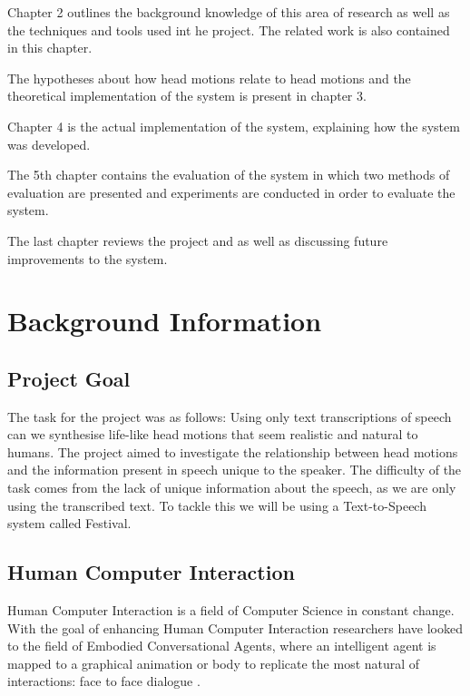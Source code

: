 \documentclass[bsc,frontabs,twoside,singlespacing,parskip,deptreport]{infthesis}
\begin{document}
Chapter 2 outlines the background knowledge of this area of research as well as the techniques and tools used int he project. The related work is also contained in this chapter.

The hypotheses about how head motions relate to head motions and the theoretical implementation of the system is present in chapter 3.

Chapter 4 is the actual implementation of the system, explaining how the system was developed.

The 5th chapter contains the evaluation of the system in which two methods of evaluation are presented and experiments are conducted in order to evaluate the system.

The last chapter reviews the project and as well as discussing future improvements to the system.



\chapter{Background Information}

\section{Project Goal}

The task for the project was as follows: Using only text transcriptions of speech can we synthesise life-like head motions that seem realistic and natural to humans. The project aimed to investigate the relationship between head motions and the information present in speech unique to the speaker. The difficulty of the task comes from the lack of unique information about the speech, as we are only using the transcribed text. To tackle this we will be using a Text-to-Speech system called Festival.

\section{Human Computer Interaction}

Human Computer Interaction is a field of Computer Science in constant change. With the goal of enhancing Human Computer Interaction researchers have looked to the field of Embodied Conversational Agents, where an intelligent agent is mapped to a graphical animation or body to replicate the most natural of interactions: face to face dialogue \cite{ecas}.
\end{document}
